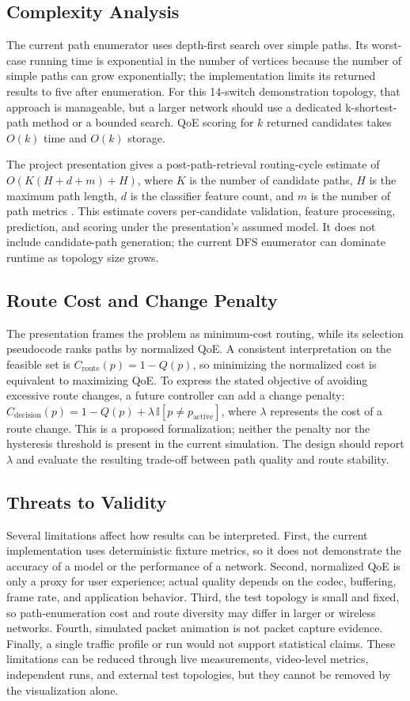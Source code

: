 \documentclass[conference]{IEEEtran}
\begin{document}
\subsection{Complexity Analysis}
The current path enumerator uses depth-first search over simple paths. Its worst-case running time is exponential in the number of vertices because the number of simple paths can grow exponentially; the implementation limits its returned results to five after enumeration. For this 14-switch demonstration topology, that approach is manageable, but a larger network should use a dedicated k-shortest-path method or a bounded search. QoE scoring for $k$ returned candidates takes $O(k)$ time and $O(k)$ storage.

The project presentation gives a post-path-retrieval routing-cycle estimate of $O(K(H+d+m)+H)$, where $K$ is the number of candidate paths, $H$ is the maximum path length, $d$ is the classifier feature count, and $m$ is the number of path metrics \cite{airsdn_presentation}. This estimate covers per-candidate validation, feature processing, prediction, and scoring under the presentation's assumed model. It does not include candidate-path generation; the current DFS enumerator can dominate runtime as topology size grows.

\subsection{Route Cost and Change Penalty}
The presentation frames the problem as minimum-cost routing, while its selection pseudocode ranks paths by normalized QoE. A consistent interpretation on the feasible set is $C_{\mathrm{route}}(p)=1-Q(p)$, so minimizing the normalized cost is equivalent to maximizing QoE. To express the stated objective of avoiding excessive route changes, a future controller can add a change penalty: $C_{\mathrm{decision}}(p)=1-Q(p)+\lambda\,\mathbb{I}[p\ne p_{\mathrm{active}}]$, where $\lambda$ represents the cost of a route change. This is a proposed formalization; neither the penalty nor the hysteresis threshold is present in the current simulation. The design should report $\lambda$ and evaluate the resulting trade-off between path quality and route stability.

\subsection{Threats to Validity}
Several limitations affect how results can be interpreted. First, the current implementation uses deterministic fixture metrics, so it does not demonstrate the accuracy of a model or the performance of a network. Second, normalized QoE is only a proxy for user experience; actual quality depends on the codec, buffering, frame rate, and application behavior. Third, the test topology is small and fixed, so path-enumeration cost and route diversity may differ in larger or wireless networks. Fourth, simulated packet animation is not packet capture evidence. Finally, a single traffic profile or run would not support statistical claims. These limitations can be reduced through live measurements, video-level metrics, independent runs, and external test topologies, but they cannot be removed by the visualization alone.
\end{document}
